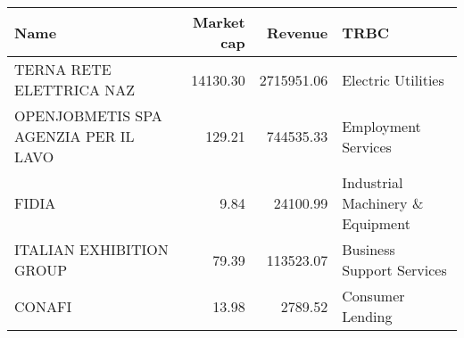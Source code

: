 \begin{tabular}{lrrl}
\toprule
                                Name &  Market cap &    Revenue &                             TRBC \\
\midrule
            TERNA RETE ELETTRICA NAZ &    14130.30 & 2715951.06 &               Electric Utilities \\
OPENJOBMETIS SPA AGENZIA PER IL LAVO &      129.21 &  744535.33 &              Employment Services \\
                               FIDIA &        9.84 &   24100.99 & Industrial Machinery \& Equipment \\
            ITALIAN EXHIBITION GROUP &       79.39 &  113523.07 &        Business Support Services \\
                              CONAFI &       13.98 &    2789.52 &                 Consumer Lending \\
\bottomrule
\end{tabular}
